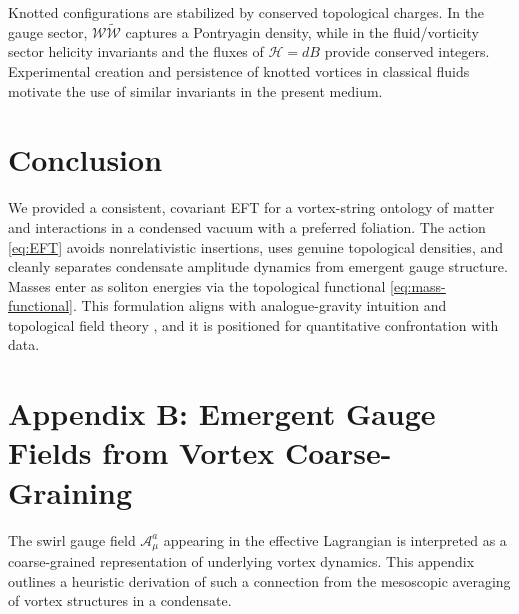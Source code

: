 \documentclass[12pt]{article}
\begin{document}
    Knotted configurations are stabilized by conserved topological charges. In the gauge sector, $\mathcal{W}\tilde{\mathcal{W}}$ captures a Pontryagin density, while in the fluid/vorticity sector helicity invariants \cite{Moffatt1969,Arnold1998} and the fluxes of $\mathcal{H}=dB$ provide conserved integers. Experimental creation and persistence of knotted vortices in classical fluids \cite{Kleckner2013} motivate the use of similar invariants in the present medium.

    \section{Conclusion}

    We provided a consistent, covariant EFT for a vortex-string ontology of matter and interactions in a condensed vacuum with a preferred foliation. The action \eqref{eq:EFT} avoids nonrelativistic insertions, uses genuine topological densities, and cleanly separates condensate amplitude dynamics from emergent gauge structure. Masses enter as soliton energies via the topological functional \eqref{eq:mass-functional}. This formulation aligns with analogue-gravity intuition \cite{Barcelo2011,Volovik2003} and topological field theory \cite{Faddeev1997,Arnold1998}, and it is positioned for quantitative confrontation with data.


    \printbibliography[title={References}]

    \appendix
    \section*{Appendix B: Emergent Gauge Fields from Vortex Coarse-Graining}
    \label{app:swirl-connection}


    The swirl gauge field \( \mathcal{A}_\mu^a \) appearing in the effective Lagrangian is interpreted as a coarse-grained representation of underlying vortex dynamics. This appendix outlines a heuristic derivation of such a connection from the mesoscopic averaging of vortex structures in a condensate.
\end{document}
